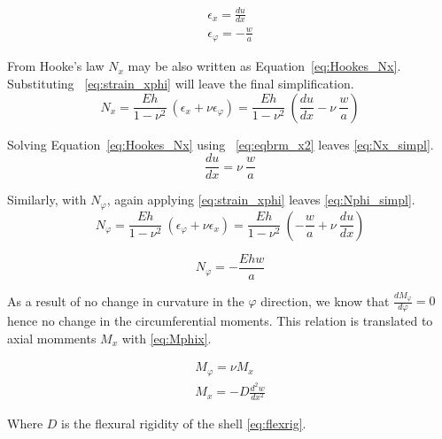 \begin{equation}
	\label{eq:strain_xphi}
	\begin{aligned}
		\epsilon_x = \frac{du}{dx}      \\
		\epsilon_\varphi = -\frac{w}{a} 
	\end{aligned}
\end{equation}

From Hooke's law $N_x$ may be also written as Equation~\ref{eq:Hookes_Nx}. Substituting ~\ref{eq:strain_xphi} will leave the final simplification.
\begin{equation}
	\label{eq:Hookes_Nx}
	N_x = \frac{Eh}{1-\nu^2}\ \left( \epsilon_x + \nu \epsilon_\varphi \right) =  \frac{Eh}{1-\nu^2}\ \left( \frac{du}{dx} -\nu \ \frac{w}{a} \right)
\end{equation} 

Solving Equation~\ref{eq:Hookes_Nx} using ~\ref{eq:eqbrm_x2} leaves \ref{eq:Nx_simpl}.
\begin{equation}
	\label{eq:Nx_simpl}
	\frac{du}{dx} =  \nu \ \frac{w}{a}
\end{equation} 

Similarly, with $N_\varphi$, again applying \ref{eq:strain_xphi} leaves \ref{eq:Nphi_simpl}.
\begin{equation}
	\label{eq:Hookes_Nphi}
	N_\varphi = \frac{Eh}{1-\nu^2}\ \left( \epsilon_\varphi + \nu \epsilon_x \right) = \frac{Eh}{1-\nu^2}\  \left( -\frac{w}{a}+\nu \ \frac{du}{dx} \right)
\end{equation} 

\begin{equation}
	\label{eq:Nphi_simpl}
	N_\varphi = - \frac{Ehw}{a}
\end{equation}

As a result of no change in curvature in the $\varphi$ direction, we know that $\frac{dM_\varphi}{d\varphi}= 0$ hence no change in the circumferential moments. This relation is translated to axial momments $M_x$ with \ref{eq:Mphix}.

\begin{equation}
	\label{eq:Mphix}
	\begin{aligned}
	M_\varphi = \nu M_x\\
	M_x = -D \frac{d^2w}{dx^2}
	\end{aligned}
\end{equation}

Where $D$ is the flexural rigidity of the shell \ref{eq:flexrig}.


